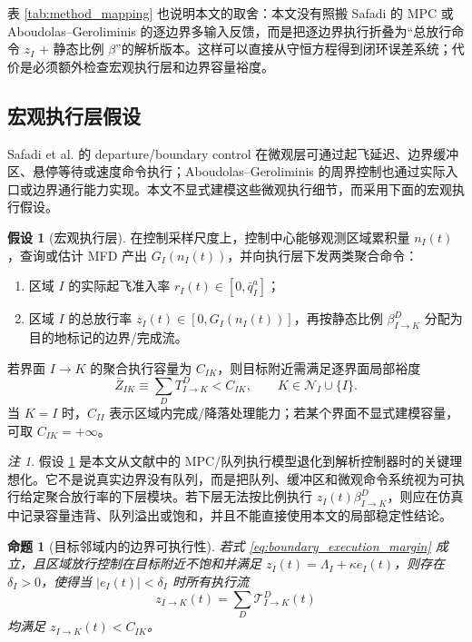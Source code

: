 \documentclass[a4paper,12pt]{article}
\theoremstyle{plain}
\newtheorem{proposition}[theorem]{命题}
\theoremstyle{definition}
\newtheorem{assumption}[theorem]{假设}
\theoremstyle{remark}
\newtheorem{remark}[theorem]{注}
\begin{document}
表 \ref{tab:method_mapping} 也说明本文的取舍：本文没有照搬 Safadi 的 MPC 或 Aboudolas--Geroliminis 的逐边界多输入反馈，而是把逐边界执行折叠为“总放行命令 $z_I$ + 静态比例 $\beta$”的解析版本。这样可以直接从守恒方程得到闭环误差系统；代价是必须额外检查宏观执行层和边界容量裕度。

\subsection{宏观执行层假设}

Safadi et al. 的 departure/boundary control 在微观层可通过起飞延迟、边界缓冲区、悬停等待或速度命令执行；Aboudolas--Geroliminis 的周界控制也通过实际入口或边界通行能力实现。本文不显式建模这些微观执行细节，而采用下面的宏观执行假设。

\begin{assumption}[宏观执行层]\label{asm:macro_execution}
在控制采样尺度上，控制中心能够观测区域累积量 $n_I(t)$，查询或估计 MFD 产出 $G_I(n_I(t))$，并向执行层下发两类聚合命令：
\begin{enumerate}
    \item 区域 $I$ 的实际起飞准入率 $r_I(t)\in[0,\bar q_I^a]$；
    \item 区域 $I$ 的总放行率 $z_I(t)\in[0,G_I(n_I(t))]$，再按静态比例 $\beta_{I\to K}^D$ 分配为目的地标记的边界/完成流。
\end{enumerate}
若界面 $I\to K$ 的聚合执行容量为 $C_{IK}$，则目标附近需满足逐界面局部裕度
\begin{equation}\label{eq:boundary_execution_margin}
    \bar Z_{IK}\equiv \sum_D T_{I\to K}^D < C_{IK},
    \qquad K\in\mathcal N_I\cup\{I\}.
\end{equation}
当 $K=I$ 时，$C_{II}$ 表示区域内完成/降落处理能力；若某个界面不显式建模容量，可取 $C_{IK}=+\infty$。
\end{assumption}

\begin{remark}
假设 \ref{asm:macro_execution} 是本文从文献中的 MPC/队列执行模型退化到解析控制器时的关键理想化。它不是说真实边界没有队列，而是把队列、缓冲区和微观命令系统视为可执行给定聚合放行率的下层模块。若下层无法按比例执行 $z_I(t)\beta_{I\to K}^D$，则应在仿真中记录容量违背、队列溢出或饱和，并且不能直接使用本文的局部稳定性结论。
\end{remark}

\begin{proposition}[目标邻域内的边界可执行性]\label{prop:boundary_executable}
若式 \eqref{eq:boundary_execution_margin} 成立，且区域放行控制在目标附近不饱和并满足 $z_I(t)=\Lambda_I+\kappa e_I(t)$，则存在 $\delta_I>0$，使得当 $|e_I(t)|<\delta_I$ 时所有执行流
\[
    z_{I\to K}(t)=\sum_D \mathcal T_{I\to K}^D(t)
\]
均满足 $z_{I\to K}(t)<C_{IK}$。
\end{proposition}
\end{document}
